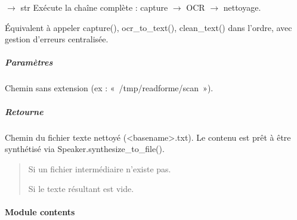 \documentclass[letterpaper,10pt,french]{sphinxmanual}
\begin{document}
\begin{fulllineitems}

\begin{fulllineitems}
\label{\detokenize{api/hardware.devices:hardware.devices.text_reader_device.TextReaderDevice.run_full_pipeline}}
\pysigstartsignatures
\pysiglinewithargsret
{}
{}
{{ $\rightarrow$ str}}
\pysigstopsignatures
\sphinxAtStartPar
Exécute la chaîne complète : capture \(\rightarrow\) OCR \(\rightarrow\) nettoyage.

\sphinxAtStartPar
Équivalent à appeler capture(), ocr\_to\_text(), clean\_text()
dans l’ordre, avec gestion d’erreurs centralisée.


\subparagraph{Paramètres}
\label{\detokenize{api/hardware.devices:id13}}\begin{description}
\sphinxAtStartPar
Chemin sans extension (ex : « /tmp/readforme/scan »).

\end{description}


\subparagraph{Retourne}
\label{\detokenize{api/hardware.devices:id14}}\begin{description}
\sphinxAtStartPar
Chemin du fichier texte nettoyé (\textless{}basename\textgreater{}.txt).
Le contenu est prêt à être synthétisé via
Speaker.synthesize\_to\_file().

\end{description}
\begin{quote}\begin{description}
\sphinxAtStartPar
Si un fichier intermédiaire n’existe pas.

\sphinxAtStartPar
Si le texte résultant est vide.

\end{description}\end{quote}

\end{fulllineitems}


\end{fulllineitems}



\paragraph{Module contents}
\label{\detokenize{api/hardware.devices:module-hardware.devices}}\label{\detokenize{api/hardware.devices:module-contents}}
\sphinxstepscope
\end{document}
